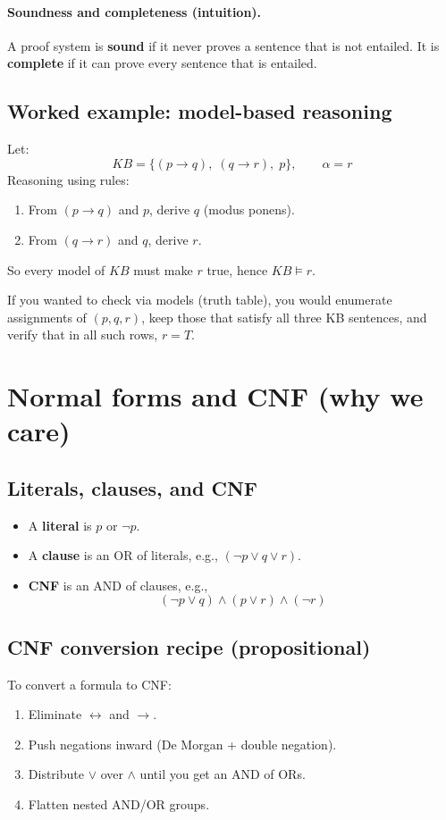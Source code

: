 \documentclass[11pt]{article}
\begin{document}
\paragraph{Soundness and completeness (intuition).}
A proof system is \textbf{sound} if it never proves a sentence that is not entailed.
It is \textbf{complete} if it can prove every sentence that is entailed.

\subsection{Worked example: model-based reasoning}
Let:
\[
  KB=\{(p\rightarrow q),\; (q\rightarrow r),\; p\},\qquad \alpha=r
\]
Reasoning using rules:
\begin{enumerate}[leftmargin=*]
  \item From $(p\rightarrow q)$ and $p$, derive $q$ (modus ponens).
  \item From $(q\rightarrow r)$ and $q$, derive $r$.
\end{enumerate}
So every model of $KB$ must make $r$ true, hence $KB \models r$.

If you wanted to check via models (truth table), you would enumerate assignments of $(p,q,r)$, keep those that satisfy all three KB sentences, and verify that in all such rows, $r=T$.

\section{Normal forms and CNF (why we care)}
\subsection{Literals, clauses, and CNF}
\begin{itemize}[leftmargin=*]
  \item A \textbf{literal} is $p$ or $\lnot p$.
  \item A \textbf{clause} is an OR of literals, e.g., $(\lnot p \lor q \lor r)$.
  \item \textbf{CNF} is an AND of clauses, e.g.,
  \[
    (\lnot p \lor q)\land (p \lor r)\land (\lnot r)
  \]
\end{itemize}

\subsection{CNF conversion recipe (propositional)}
To convert a formula to CNF:
\begin{enumerate}[leftmargin=*]
  \item Eliminate $\leftrightarrow$ and $\rightarrow$.
  \item Push negations inward (De Morgan + double negation).
  \item Distribute $\lor$ over $\land$ until you get an AND of ORs.
  \item Flatten nested AND/OR groups.
\end{enumerate}
\end{document}
